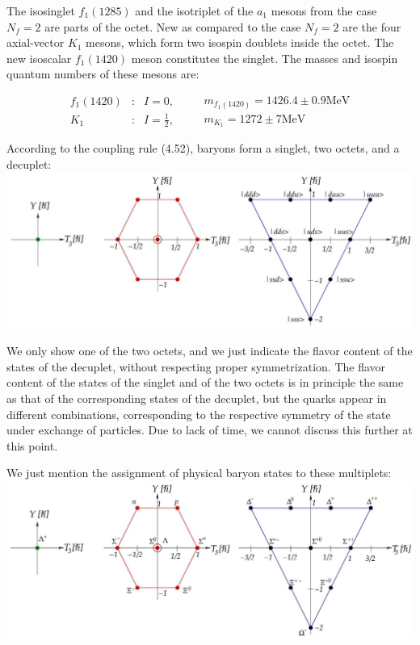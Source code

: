 \documentclass[10pt, letterpaper]{article}
\begin{document}
The isosinglet $f_{1}(1285)$ and the isotriplet of the $a_{1}$ mesons from the case $N_{f}=2$ are parts of the octet. New as compared to the case $N_{f}=2$ are the four axial-vector $K_{1}$ mesons, which form two isospin doublets inside the octet. The new isoscalar $f_{1}(1420)$ meson constitutes the singlet. The masses and isospin quantum numbers of these mesons are:

$$
\begin{array}{rll}
f_{1}(1420) & : & I=0, \\
K_{1} & : & I=\frac{1}{2},
\end{array} \quad \begin{aligned}
& m_{f_{1}(1420)}=1426.4 \pm 0.9 \mathrm{MeV} \\
& m_{K_{1}}=1272 \pm 7 \mathrm{MeV}
\end{aligned}
$$

According to the coupling rule (4.52), baryons form a singlet, two octets, and a decuplet:\\
\includegraphics[scale=0.3, center]{2025_05_20_8618f55a41bfe980b4b2g-71(1)}

We only show one of the two octets, and we just indicate the flavor content of the states of the decuplet, without respecting proper symmetrization. The flavor content of the states of the singlet and of the two octets is in principle the same as that of the corresponding states of the decuplet, but the quarks appear in different combinations, corresponding to the respective symmetry of the state under exchange of particles. Due to lack of time, we cannot discuss this further at this point.

We just mention the assignment of physical baryon states to these multiplets:\\
\includegraphics[scale=0.3, center]{2025_05_20_8618f55a41bfe980b4b2g-72}
\end{document}
